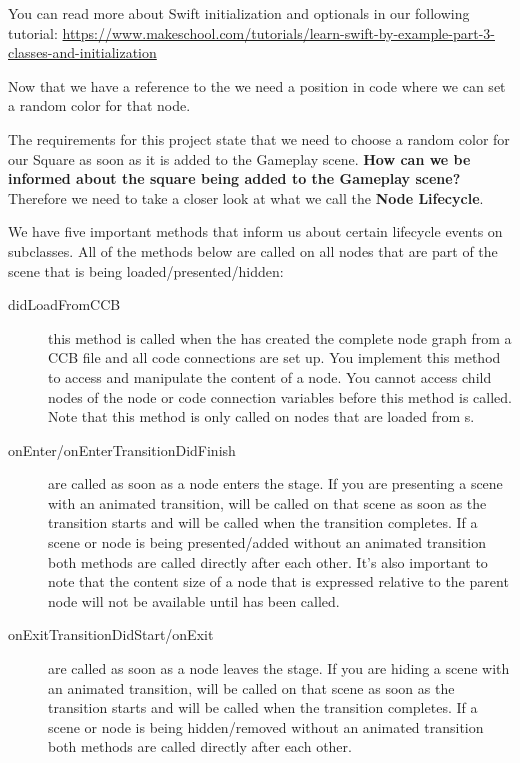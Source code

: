 \begin{details}
You can read more about Swift initialization and optionals in our following
tutorial:
\url{https://www.makeschool.com/tutorials/learn-swift-by-example-part-3-classes-and-initialization}
\end{details}

Now that we have a reference to the  we
need a position in code where we can set a random color for that node.

The requirements for this project state that we need to choose a random color
for our Square as soon as it is added to the Gameplay scene. \textbf{How can we
be informed about the square being added to the Gameplay scene?} Therefore we
need to take a closer look at what we call the \textbf{Node
Lifecycle}.

We have five important methods that inform us about certain lifecycle events on
\ccnode{} subclasses. All of the methods below are called on all nodes that are
part of the scene that is being loaded/presented/hidden:

\begin{description}
  \item[didLoadFromCCB] this method is called when the 
  has created the complete node graph from a CCB file and all code connections
  are set up. You implement this method to access and manipulate the content of
  a node. You cannot access child nodes of the node or code connection
  variables before this method is called. Note that this method is only called
  on nodes that are loaded from \ccbfile{}s.
  \item[onEnter/onEnterTransitionDidFinish] are called as soon as a node enters
  the stage. If you are presenting a scene with an animated transition,
   will be called on that scene as soon as the transition
  starts and  will be called when the transition
  completes. If a scene or node is being presented/added without an animated
  transition both methods are called directly after each other. It's also
  important to note that the content size of a node that is expressed relative
  to the parent node will not be available until  has been
  called.
  \item[onExitTransitionDidStart/onExit] are called as soon as a node leaves the
  stage. If you are hiding a scene with an animated transition,
   will be called on that scene as soon as
  the transition starts and  will be called when the
  transition completes. If a scene or node is being hidden/removed without an
  animated transition both methods are called directly after each other.
\end{description}

